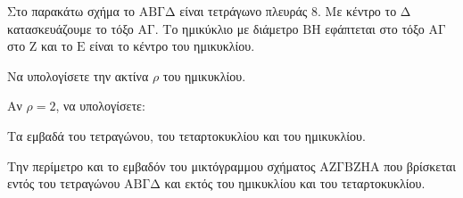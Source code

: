 Στο παρακάτω σχήμα το $\mathrm{AB\Gamma\Delta}$ είναι τετράγωνο πλευράς $8$. Με κέντρο το $\mathrm{\Delta}$ κατασκευάζουμε το τόξο $\mathrm{A\Gamma}$. Το ημικύκλιο με διάμετρο $\mathrm{BH}$ εφάπτεται στο τόξο $\mathrm{A\Gamma}$ στο $\mathrm{Z}$ και το $\mathrm{E}$ είναι το κέντρο του ημικυκλίου.
\begin{alist}
    \item Να υπολογίσετε την ακτίνα $\rho$ του ημικυκλίου. 
    \item Αν $\rho=2$, να υπολογίσετε:
    \begin{rlist}
        \item Τα εμβαδά του τετραγώνου, του τεταρτοκυκλίου και του ημικυκλίου. 
        \item Την περίμετρο και το εμβαδόν του μικτόγραμμου σχήματος $\mathrm{AZ\Gamma BZHA}$ που βρίσκεται εντός του τετραγώνου $\mathrm{AB\Gamma\Delta}$ και εκτός του ημικυκλίου και του τεταρτοκυκλίου. 
    \end{rlist}
\end{alist}